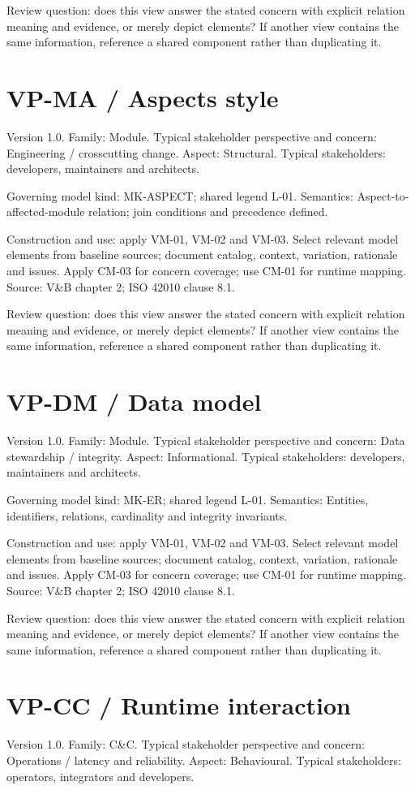 \documentclass[11pt,letterpaper]{article}
\newcommand{\docsection}[1]{\Needspace{5\baselineskip}\section{#1}}
\begin{document}
Review question: does this view answer the stated concern with explicit relation meaning and evidence, or merely depict elements? If another view contains the same information, reference a shared component rather than duplicating it.

\docsection{VP-MA / Aspects style}
Version 1.0. Family: Module. Typical stakeholder perspective and concern: Engineering / crosscutting change. Aspect: Structural. Typical stakeholders: developers, maintainers and architects.

Governing model kind: MK-ASPECT; shared legend L-01. Semantics: Aspect-to-affected-module relation; join conditions and precedence defined.

Construction and use: apply VM-01, VM-02 and VM-03. Select relevant model elements from baseline sources; document catalog, context, variation, rationale and issues. Apply CM-03 for concern coverage; use CM-01 for runtime mapping. Source: V\&B chapter 2; ISO 42010 clause 8.1.

Review question: does this view answer the stated concern with explicit relation meaning and evidence, or merely depict elements? If another view contains the same information, reference a shared component rather than duplicating it.

\docsection{VP-DM / Data model}
Version 1.0. Family: Module. Typical stakeholder perspective and concern: Data stewardship / integrity. Aspect: Informational. Typical stakeholders: developers, maintainers and architects.

Governing model kind: MK-ER; shared legend L-01. Semantics: Entities, identifiers, relations, cardinality and integrity invariants.

Construction and use: apply VM-01, VM-02 and VM-03. Select relevant model elements from baseline sources; document catalog, context, variation, rationale and issues. Apply CM-03 for concern coverage; use CM-01 for runtime mapping. Source: V\&B chapter 2; ISO 42010 clause 8.1.

Review question: does this view answer the stated concern with explicit relation meaning and evidence, or merely depict elements? If another view contains the same information, reference a shared component rather than duplicating it.

\docsection{VP-CC / Runtime interaction}
Version 1.0. Family: C\&C. Typical stakeholder perspective and concern: Operations / latency and reliability. Aspect: Behavioural. Typical stakeholders: operators, integrators and developers.
\end{document}

